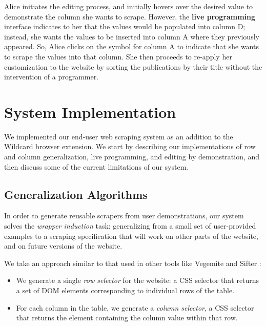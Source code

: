 \documentclass[sigconf,10pt]{acmart}
\providecommand{\tightlist}{%
  \setlength{\itemsep}{0pt}\setlength{\parskip}{0pt}}
\begin{document}
Alice initiates the editing process, and initially hovers over the
desired value to demonstrate the column she wants to scrape. However,
the \textbf{live programming} interface indicates to her that the values
would be populated into column D; instead, she wants the values to be
inserted into column A where they previously appeared. So, Alice clicks
on the symbol for column A to indicate that she wants to scrape the
values into that column. She then proceeds to re-apply her customization
to the website by sorting the publications by their title without the
intervention of a programmer.

\hypertarget{sec:implementation}{%
\section{System Implementation}\label{sec:implementation}}

We implemented our end-user web scraping system as an addition to the
Wildcard browser extension. We start by describing our implementations
of row and column generalization, live programming, and editing by
demonstration, and then discuss some of the current limitations of our
system.

\hypertarget{generalization-algorithms}{%
\subsection{Generalization Algorithms}\label{generalization-algorithms}}

In order to generate reusable scrapers from user demonstrations, our
system solves the \emph{wrapper induction} \citep{kushmerick2000} task:
generalizing from a small set of user-provided examples to a scraping
specification that will work on other parts of the website, and on
future versions of the website.

We take an approach similar to that used in other tools like Vegemite
\citep{lin2009} and Sifter \citep{huynh2006}:

\begin{itemize}
\tightlist
\item
  We generate a single \emph{row selector} for the website: a CSS
  selector that returns a set of DOM elements corresponding to
  individual rows of the table.
\item
  For each column in the table, we generate a \emph{column selector}, a
  CSS selector that returns the element containing the column value
  within that row.
\end{itemize}
\end{document}
